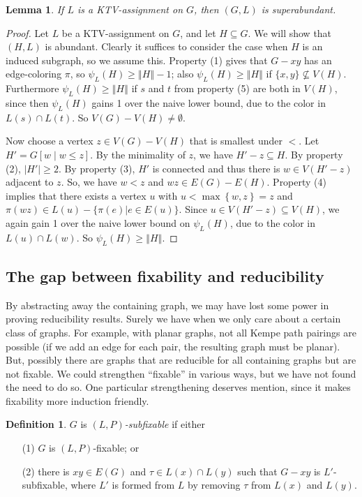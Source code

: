 \documentclass[12pt]{article}
\theoremstyle{plain}
\newtheorem{lem}[thm]{Lemma}
\theoremstyle{definition}
\newtheorem{defn}{Definition}
\theoremstyle{remark}
\newcommand{\set}[1]{\left\{ #1 \right\}}
\newcommand{\card}[1]{\left|#1\right|}
\newcommand{\size}[1]{\left\Vert#1\right\Vert}
\newcommand{\brackets}[1]{\left[ #1 \right]}
\begin{document}
\begin{lem}\label{KTVImpliesSuperabundant}
If $L$ is a KTV-assignment on $G$, then $(G, L)$ is superabundant.
\end{lem}
\begin{proof}
Let $L$ be a KTV-assignment on $G$, and let $H \subseteq G$.  We will show that
$(H,L)$ is abundant.  
Clearly it suffices to consider the case when $H$ is an induced subgraph, so we
assume this.
Property (1) gives that $G-xy$ has an edge-coloring
$\pi$, so $\psi_L(H)\ge \size{H}-1$; also $\psi_L(H)\ge \size{H}$ if
$\{x,y\}\not\subseteq V(H)$.  Furthermore $\psi_L(H)\ge \size{H}$ if $s$ and
$t$ from property (5) are both in $V(H)$, since then $\psi_L(H)$ gains 1 over
the naive lower bound, due to the color in $L(s)\cap L(t)$.  So $V(G)-
V(H)\ne \emptyset$.

Now choose a vertex $z \in V(G) - V(H)$ that is smallest under $<$.  
Let $H' = G\brackets{w \mid w \le z}$.  By the minimality of $z$, we have $H' -
z \subseteq H$. By property (2), $\card{H'} \ge 2$.  By property (3), $H'$ is
connected and thus there is $w \in V(H' - z)$ adjacent to $z$. So, we have $w <
z$ and $wz\in E(G)-E(H)$.  %
Property (4) implies that there exists a vertex $u$ with $u <
\max\set{w, z} = z$ and $\pi(wz) \in L(u)-\{\pi(e)|e\in E(u)\}$.  Since $u \in
V(H' - z) \subseteq V(H)$, we again gain 1 over the naive lower bound on
$\psi_L(H)$, due to the color in $L(u)\cap L(w)$.  So $\psi_L(H)\ge \size{H}$.
\end{proof}

\subsection{The gap between fixability and reducibility}
By abstracting away the containing graph, we may have lost some power in proving
reducibility results. Surely we have when we only care about a certain class of
graphs. For example, with planar graphs, not all Kempe path pairings are
possible (if we add an edge for each pair, the resulting graph must be
planar).  But, possibly there are graphs that are reducible for all containing
graphs but are not fixable.  We could strengthen ``fixable'' in various ways,
but we have not found the need to do so.  One particular strengthening 
deserves mention, since it makes fixability more induction friendly.  

\begin{defn}
$G$ is \emph{$(L, P)$-subfixable} if either
\begin{enumerate}
\item[(1)] $G$ is $(L, P)$-fixable; or
\item[(2)] there is $xy \in E(G)$ and $\tau \in L(x) \cap L(y)$ such that
$G-xy$ is $L'$-subfixable, where $L'$ is formed from $L$ by removing $\tau$ from
$L(x)$ and $L(y)$.
\end{enumerate}
\end{defn}
\end{document}
